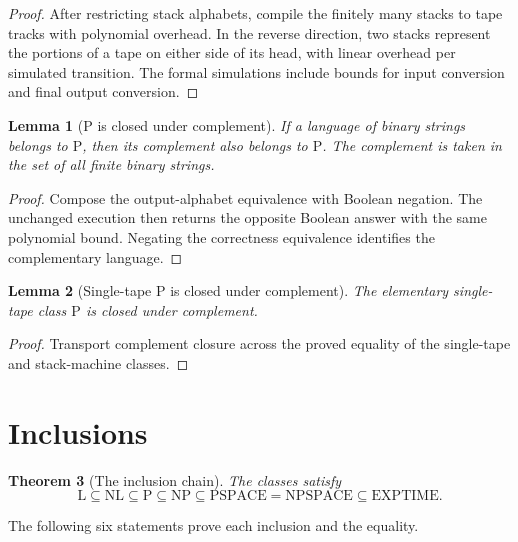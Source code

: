 \documentclass[11pt]{article}
\newtheorem{theorem}{Theorem}
\newtheorem{lemma}[theorem]{Lemma}
\theoremstyle{definition}
\begin{document}
\begin{proof}\leavevmode
After restricting stack alphabets, compile the finitely many stacks to tape tracks with polynomial overhead. In the reverse direction, two stacks represent the portions of a tape on either side of its head, with linear overhead per simulated transition. The formal simulations include bounds for input conversion and final output conversion.
\qedhere
\end{proof}

\begin{lemma}[P is closed under complement]\leavevmode
If a language of binary strings belongs to $\mathrm{P}$, then its complement
also belongs to $\mathrm{P}$. The complement is taken in the set of all finite
binary strings.
\end{lemma}

\begin{proof}\leavevmode
Compose the output-alphabet equivalence with Boolean negation. The unchanged execution then returns the opposite Boolean answer with the same polynomial bound. Negating the correctness equivalence identifies the complementary language.
\qedhere
\end{proof}

\begin{lemma}[Single-tape P is closed under complement]\leavevmode
The elementary single-tape class $\mathrm{P}$ is closed under complement.
\end{lemma}

\begin{proof}\leavevmode
Transport complement closure across the proved equality of the single-tape and stack-machine classes.
\qedhere
\end{proof}

\section{Inclusions}
\begin{theorem}[The inclusion chain]\leavevmode
The classes satisfy
\[
\mathrm{L}\subseteq\mathrm{NL}\subseteq\mathrm{P}\subseteq\mathrm{NP}
\subseteq\mathrm{PSPACE}=\mathrm{NPSPACE}\subseteq\mathrm{EXPTIME}.
\]
\end{theorem}
The following six statements prove each inclusion and the equality.
\end{document}
